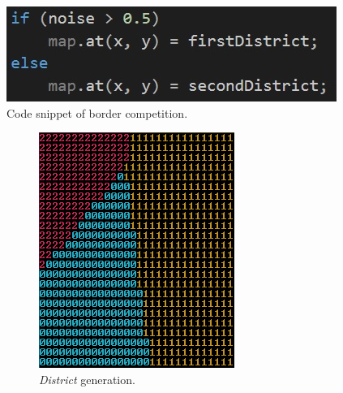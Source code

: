 	
	\begin{figure}[h]
		\centering
		\includegraphics[width=0.4\linewidth]{"Images/borderCompetition"}
		\caption{Code snippet of border competition.}
		\label{fig:codeSnippet-borderCompetition}
	\end{figure}
		
	\begin{figure}[h]
		\begin{subfigure}{0.5\textwidth}
			\centering
			\includegraphics[width=0.9\linewidth]{"Images/map districts colored"}
			\caption{\textit{District} generation.}
			\label{fig:map-districts}
		\end{subfigure}
		\begin{subfigure}{0.5\textwidth}
			\centering

\end{subfigure}
\end{figure}

